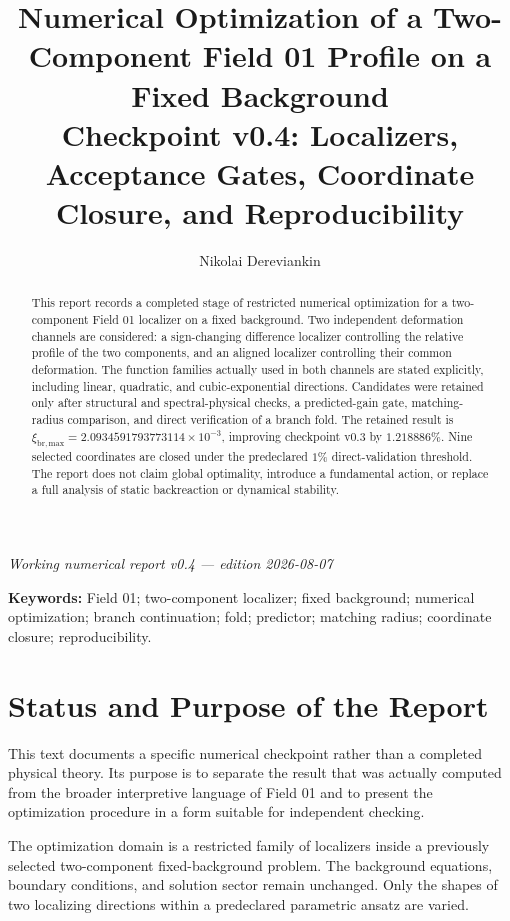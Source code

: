 \documentclass[11pt,a4paper]{article}
\title{Numerical Optimization of a Two-Component Field 01 Profile on a Fixed Background\\
\large Checkpoint v0.4: Localizers, Acceptance Gates, Coordinate Closure, and Reproducibility}
\author{Nikolai Dereviankin}
\date{}
\newcommand{\xibr}{\xi_{\mathrm{br,max}}}
\begin{document}
\maketitle

\begin{center}
\textit{Working numerical report v0.4 --- edition 2026-08-07}
\end{center}

\begin{abstract}
This report records a completed stage of restricted numerical optimization for a two-component Field 01 localizer on a fixed background. Two independent deformation channels are considered: a sign-changing difference localizer controlling the relative profile of the two components, and an aligned localizer controlling their common deformation. The function families actually used in both channels are stated explicitly, including linear, quadratic, and cubic-exponential directions. Candidates were retained only after structural and spectral-physical checks, a predicted-gain gate, matching-radius comparison, and direct verification of a branch fold. The retained result is $\xibr=2.0934591793773114\times10^{-3}$, improving checkpoint v0.3 by $1.218886\%$. Nine selected coordinates are closed under the predeclared $1\%$ direct-validation threshold. The report does not claim global optimality, introduce a fundamental action, or replace a full analysis of static backreaction or dynamical stability.
\end{abstract}

\textbf{Keywords:} Field 01; two-component localizer; fixed background; numerical optimization; branch continuation; fold; predictor; matching radius; coordinate closure; reproducibility.

\section{Status and Purpose of the Report}

This text documents a specific numerical checkpoint rather than a completed physical theory. Its purpose is to separate the result that was actually computed from the broader interpretive language of Field 01 and to present the optimization procedure in a form suitable for independent checking.

The optimization domain is a restricted family of localizers inside a previously selected two-component fixed-background problem. The background equations, boundary conditions, and solution sector remain unchanged. Only the shapes of two localizing directions within a predeclared parametric ansatz are varied.
\end{document}
